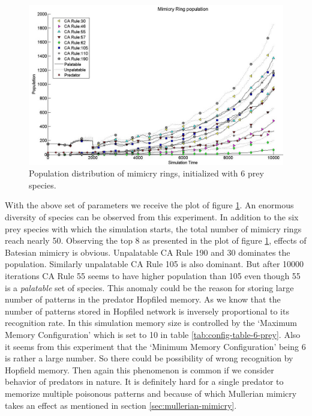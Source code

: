 \begin{figure}[H]
	\centering
	\includegraphics[scale=0.45]{images/simTime10k-6Prey}
	\caption[Population distribution of mimicry rings (6 prey species)]{Population distribution of mimicry rings, initialized with 6 prey species.}
	\label{fig:plot-6-prey}
\end{figure}

With the above set of parameters we receive the plot of figure \ref{fig:plot-6-prey}. An enormous diversity of species can be observed from this experiment. In addition to the six prey species with which the simulation starts, the total number of mimicry rings reach nearly 50. Observing the top 8 as presented in the plot of figure \ref{fig:plot-6-prey}, effects of Batesian mimicry is obvious. Unpalatable CA Rule 190 and 30 dominates the population. Similarly unpalatable CA Rule 105 is also dominant. But after 10000 iterations CA Rule 55 seems to have higher population than 105 even though 55 is a \textsl{palatable} set of species. This anomaly could be the reason for storing large number of patterns in the predator Hopfiled memory. As we know that the number of patterns stored in Hopfiled network is inversely proportional to its recognition rate. In this simulation memory size is controlled by the `Maximum Memory Configuration' which is set to 10 in table \ref{tab:config-table-6-prey}. Also it seems from this experiment that the `Minimum Memory Configuration' being 6 is rather a large number. So there could be possibility of wrong recognition by Hopfield memory. Then again this phenomenon is common if we consider behavior of predators in nature. It is definitely hard for a single predator to memorize multiple poisonous patterns and because of which Mullerian mimicry takes an effect as mentioned in section \ref{sec:mullerian-mimicry}.


